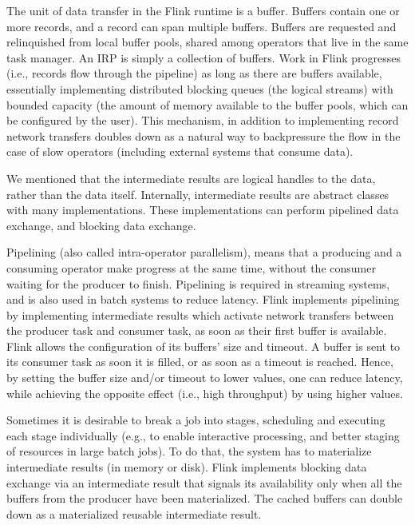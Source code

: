 The unit of data transfer in the Flink runtime is a buffer. Buffers contain one or more records, and a record can span multiple buffers. Buffers are requested and relinquished from local buffer pools, shared among operators that live in the same task manager. An IRP is simply a collection of buffers. Work in Flink progresses (i.e., records flow through the pipeline) as long as there are buffers available, essentially implementing distributed blocking queues (the logical streams) with bounded capacity (the amount of memory available to the buffer pools, which can be configured by the user). This mechanism, in addition to implementing record network transfers doubles down as a natural way to backpressure the flow in the case of slow operators (including external systems that consume data). 

We mentioned that the intermediate results are logical handles to the data, rather than the data itself. Internally, intermediate results are abstract classes with many implementations. These implementations can perform pipelined data exchange, and blocking data exchange.

 Pipelining (also called intra-operator parallelism), means that a producing and a consuming operator make progress at the same time, without the consumer waiting for the producer to finish. Pipelining is required in streaming systems, and is also used in batch systems to reduce latency. Flink implements pipelining by implementing intermediate results which activate network transfers between the producer task and consumer task,  as soon as their first buffer is available. Flink allows the configuration of its buffers' size and timeout. A buffer is sent to its consumer task as soon it is filled,  or as soon as a timeout is reached. Hence, by setting the buffer size and/or timeout to lower values, one can reduce latency, while achieving the opposite effect (i.e., high throughput) by using higher values.

 Sometimes it is desirable to break a job into stages, scheduling and executing each stage individually (e.g., to enable interactive processing, and better staging of resources in large batch jobs). To do that, the system has to materialize intermediate results (in memory or disk). Flink implements blocking data exchange via an intermediate result that signals its availability only when all the buffers from the producer have been materialized. The cached buffers can double down as a materialized reusable intermediate result. 

